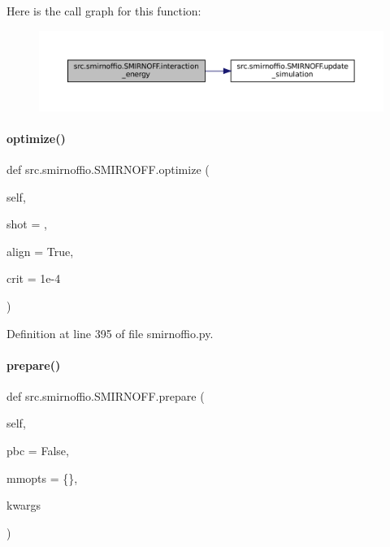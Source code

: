 Here is the call graph for this function\+:
\nopagebreak
\begin{figure}[H]
\begin{center}
\leavevmode
\includegraphics[width=350pt]{classsrc_1_1smirnoffio_1_1SMIRNOFF_a64a07cbc61134660c4c6d97337b1e785_cgraph}
\end{center}
\end{figure}
\mbox{\label{classsrc_1_1smirnoffio_1_1SMIRNOFF_aae8b084d595c6779e535519abf4718c2}} 
\paragraph{\texorpdfstring{optimize()}{optimize()}}
{\footnotesize\ttfamily def src.\+smirnoffio.\+S\+M\+I\+R\+N\+O\+F\+F.\+optimize (\begin{DoxyParamCaption}\item[{}]{self,  }\item[{}]{shot = {},  }\item[{}]{align = {\ttfamily True},  }\item[{}]{crit = {\ttfamily 1e-\/4} }\end{DoxyParamCaption})}



Definition at line 395 of file smirnoffio.\+py.

\mbox{\label{classsrc_1_1smirnoffio_1_1SMIRNOFF_aec97b6c7793cb75a0c653e5e2b393799}} 
\paragraph{\texorpdfstring{prepare()}{prepare()}}
{\footnotesize\ttfamily def src.\+smirnoffio.\+S\+M\+I\+R\+N\+O\+F\+F.\+prepare (\begin{DoxyParamCaption}\item[{}]{self,  }\item[{}]{pbc = {\ttfamily False},  }\item[{}]{mmopts = {\ttfamily \{\}},  }\item[{}]{kwargs }\end{DoxyParamCaption})}



